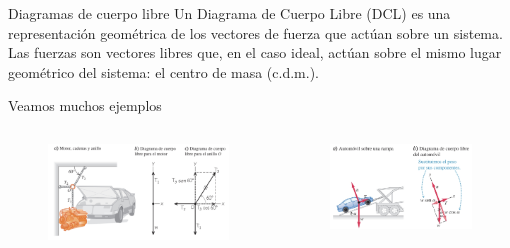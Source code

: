 \begin{frame}{Diagramas de cuerpo libre}
    Un Diagrama de Cuerpo Libre (DCL) es una representación geométrica de los vectores de fuerza que actúan sobre un sistema. Las fuerzas son vectores libres que, en el caso ideal, actúan sobre el mismo lugar geométrico del sistema: el centro de masa (c.d.m.).
\end{frame}

\begin{frame}
    \begin{center}
        \Huge Veamos muchos ejemplos
    \end{center}
\end{frame}

\begin{frame}
\begin{columns}
    \begin{figure}
        \centering
        \includegraphics[width=1\linewidth]{figures/diagrama1.jpg}
    \end{figure}

    \begin{figure}
        \centering
        \includegraphics[width=1\linewidth]{figures/diagrama2.jpg}
    \end{figure}
\end{columns}


\end{frame}
